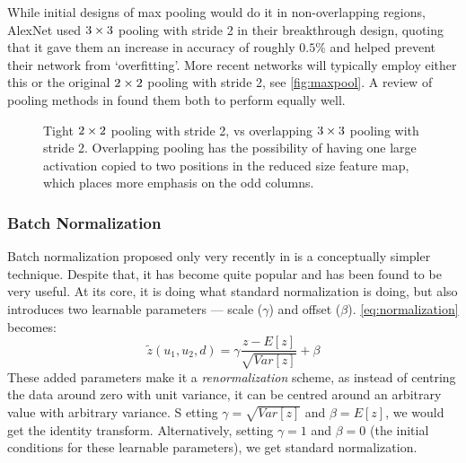   While initial designs of max pooling would do it in non-overlapping regions, 
  AlexNet used $3\times 3$ pooling with stride 2 in their breakthrough design,
  quoting that it gave them an increase in accuracy of roughly $0.5\%$ and
  helped prevent their network from `overfitting'. More recent networks will
  typically employ either this or the original $2\times 2$ pooling with stride 2,
  see \autoref{fig:maxpool}. A review of pooling methods in
  \citep{mishkin_systematic_2016} found them both to perform equally well.
  
  \begin{figure}
    \centering
    \centering
    \caption[Tight vs.\ overlapping pooling]
            { Tight $2\times 2$ pooling with stride 2, vs
             overlapping $3\times 3$ pooling with
            stride 2. Overlapping pooling has the possibility of having one
            large activation copied to two positions in the reduced size
            feature map, which places more emphasis on the odd columns.}
    \label{fig:maxpool}
  \end{figure}

\subsubsection{Batch Normalization}
      Batch normalization proposed only very recently in
      \citep{ioffe_batch_2015} is a conceptually simpler technique. Despite
      that, it has become quite popular and has been found to be very useful.
      At its core, it is doing what standard normalization is doing, but also
      introduces two learnable parameters --- scale ($\gamma$) and offset
      ($\beta$).
      \autoref{eq:normalization} becomes:
      \begin{equation}
        \tilde{z}(u_1,u_2,d) = \gamma\frac{z-E[z]}{\sqrt{Var[z]}} + \beta 
				\label{eq:batch_normalization}
      \end{equation}
      These added parameters make it a \emph{renormalization} scheme, as instead of
      centring the data around zero with unit variance, it can be centred
      around an arbitrary value with arbitrary variance. S etting
      $\gamma = \sqrt{Var[z]}$ and $\beta = E[z]$, we would get the identity
      transform. Alternatively, setting $\gamma = 1$ and $\beta = 0$ (the
      initial conditions for these learnable parameters), we get standard
      normalization.
      
